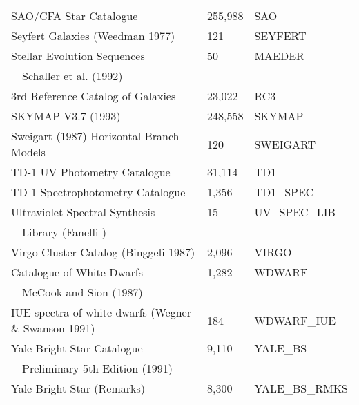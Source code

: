 \begin{tabular}{lll}
 SAO/CFA Star Catalogue & 255,988 & SAO            \\
 Seyfert Galaxies (Weedman 1977) & 121 & SEYFERT \\
 Stellar Evolution Sequences & 50 & MAEDER \\
 ~~Schaller et al. (1992) & & \\
 3rd Reference Catalog of Galaxies  & 23,022 & RC3 \\
 SKYMAP V3.7 (1993) & 248,558 & SKYMAP \\
 Sweigart (1987) Horizontal Branch Models & 120 & SWEIGART \\
 TD-1 UV Photometry Catalogue & 31,114 & TD1                 \\
 TD-1 Spectrophotometry Catalogue & 1,356 & TD1\_SPEC \\
 Ultraviolet Spectral Synthesis    & 15 & UV\_SPEC\_LIB \\
 ~~Library (Fanelli \ea 1987) & & \\
 Virgo Cluster Catalog (Binggeli 1987) & 2,096 & VIRGO \\
 Catalogue of White Dwarfs   & 1,282 & WDWARF \\
 ~~McCook and Sion (1987) & & \\
 IUE spectra of white dwarfs (Wegner \& Swanson 1991) & 184 & WDWARF\_IUE \\
 Yale Bright Star Catalogue & 9,110 & YALE\_BS        \\  
 ~~Preliminary 5th Edition (1991) & & \\
 Yale Bright Star (Remarks) & 8,300 & YALE\_BS\_RMKS    \\

\end{tabular}
                                                      
                                        
